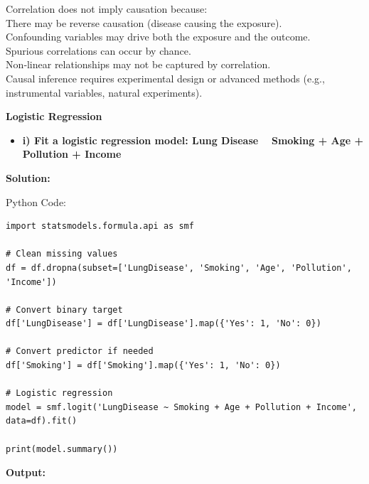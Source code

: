 \documentclass[12pt]{article}
\begin{document}
\vspace{0.3cm}
Correlation does not imply causation because:\\
There may be reverse causation (disease causing the exposure).\\
Confounding variables may drive both the exposure and the outcome.\\
Spurious correlations can occur by chance.\\
Non‑linear relationships may not be captured by correlation.\\
Causal inference requires experimental design or advanced methods (e.g., instrumental variables, natural experiments).

\vspace{4cm}

{\large \textbf{Logistic Regression}}

\vspace{0.3cm}

\begin{itemize}
    \item\textbf{i) Fit a logistic regression model: Lung Disease ~ Smoking + Age + Pollution + Income}
\end{itemize}

{\large\textbf{Solution:}}

\vspace{0.1cm}

{\large{Python Code:}}

\vspace{0.2cm}

\begin{verbatim}
import statsmodels.formula.api as smf

# Clean missing values
df = df.dropna(subset=['LungDisease', 'Smoking', 'Age', 'Pollution', 'Income'])

# Convert binary target
df['LungDisease'] = df['LungDisease'].map({'Yes': 1, 'No': 0})

# Convert predictor if needed
df['Smoking'] = df['Smoking'].map({'Yes': 1, 'No': 0})

# Logistic regression
model = smf.logit('LungDisease ~ Smoking + Age + Pollution + Income', data=df).fit()

print(model.summary())
\end{verbatim}

\textbf{Output:}

\vspace{0.3cm}
\end{document}
